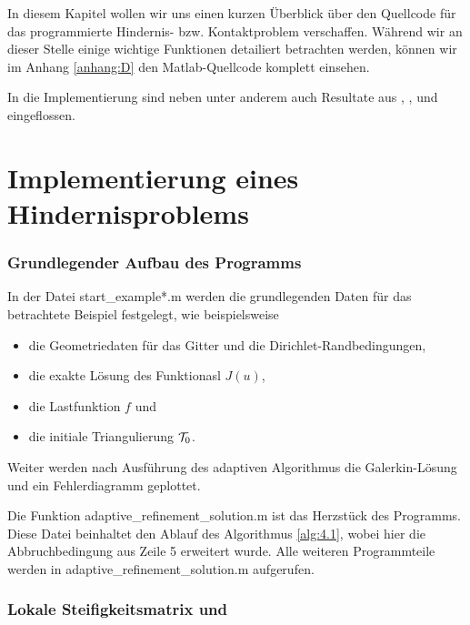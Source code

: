 \label{kap:5}

In diesem Kapitel wollen wir uns einen kurzen Überblick über den Quellcode für das programmierte Hindernis- bzw. Kontaktproblem verschaffen. Während wir an dieser Stelle einige wichtige Funktionen detailiert betrachten werden, können wir im Anhang \ref{anhang:D} den Matlab-Quellcode komplett einsehen.

In die Implementierung sind neben \cite{ZouVee} unter anderem auch Resultate aus \cite{MorNoc}, \cite{BarCar}, \cite{BraeFEM} und \cite{EPS} eingeflossen.


\section{Implementierung eines Hindernisproblems}
\label{kap:5.1}


\subsubsection{Grundlegender Aufbau des Programms}

In der Datei {\ttfamily start_example*.m} werden die grundlegenden Daten für das betrachtete Beispiel festgelegt, wie beispielsweise
\begin{itemize}
\item die Geometriedaten für das Gitter und die Dirichlet-Randbedingungen,
\item die exakte Lösung des Funktionasl $J(u)$,
\item die Lastfunktion $f$ und
\item die initiale Triangulierung $\mathcal T_0$.
\end{itemize}
Weiter werden nach Ausführung des adaptiven Algorithmus die Galerkin-Lösung und ein Fehlerdiagramm geplottet. 

Die Funktion {\ttfamily adaptive_refinement_solution.m} ist das Herzstück des Programms. Diese Datei beinhaltet den Ablauf des Algorithmus \ref{alg:4.1}, wobei hier die Abbruchbedingung aus Zeile 5 erweitert wurde. Alle weiteren Programmteile werden in {\ttfamily adaptive_refinement_solution.m} aufgerufen.


\subsubsection{Lokale Steifigkeitsmatrix und }

